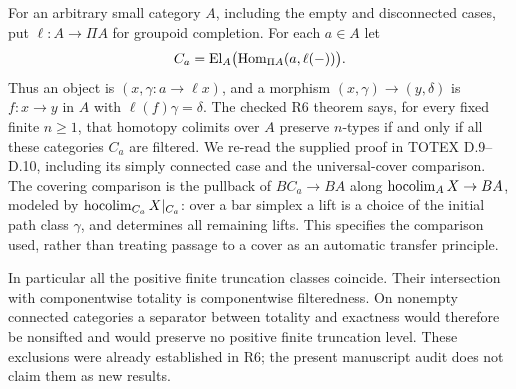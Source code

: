 \begin{remark}
\label{D:positive-truncation-record}
For an arbitrary small category $A$, including the empty and
disconnected cases, put $\ell:A\to\Pi A$ for groupoid completion.
For each $a\in A$ let
\[
 C_a=\operatorname{El}_A\bigl(\operatorname{Hom}_{\Pi A}(a,\ell(-))\bigr).
\]
Thus an object is $(x,\gamma:a\to\ell x)$, and a morphism
$(x,\gamma)\to(y,\delta)$ is $f:x\to y$ in $A$ with
$\ell(f)\gamma=\delta$. The checked R6 theorem says, for every
fixed finite $n\geq1$, that homotopy colimits over $A$ preserve
$n$-types if and only if all these categories $C_a$ are filtered.
We re-read the supplied proof in TOTEX D.9--D.10, including its
simply connected case and the universal-cover comparison. The
covering comparison is the pullback of $BC_a\to BA$ along
$\operatorname*{hocolim}_A X\to BA$, modeled by $\operatorname*{hocolim}_{C_a}X|_{C_a}$:
over a bar simplex a lift is a choice of the initial path class
$\gamma$, and determines all remaining lifts. This specifies the
comparison used, rather than treating passage to a cover as an
automatic transfer principle.

In particular all the positive finite truncation classes coincide.
Their intersection with componentwise totality is componentwise
filteredness. On nonempty connected categories a separator between
totality and exactness would therefore be nonsifted and would
preserve no positive finite truncation level. These exclusions were
already established in R6; the present manuscript audit does not
claim them as new results.
\end{remark}

